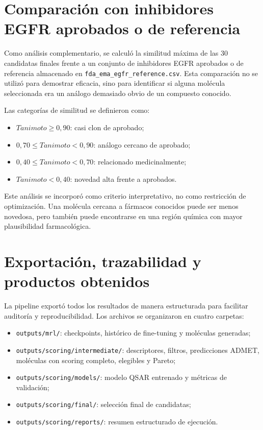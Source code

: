 \documentclass[IB]{TFUOC}%
\begin{document}
\section{Comparación con inhibidores EGFR aprobados o de referencia}

Como análisis complementario, se calculó la similitud máxima de las 30 candidatas finales frente a un conjunto de inhibidores EGFR aprobados o de referencia almacenado en \texttt{fda\_ema\_egfr\_reference.csv}. Esta comparación no se utilizó para demostrar eficacia, sino para identificar si alguna molécula seleccionada era un análogo demasiado obvio de un compuesto conocido.

Las categorías de similitud se definieron como:

\begin{itemize}
    \item $Tanimoto \geq 0,90$: casi clon de aprobado;
    \item $0,70 \leq Tanimoto < 0,90$: análogo cercano de aprobado;
    \item $0,40 \leq Tanimoto < 0,70$: relacionado medicinalmente;
    \item $Tanimoto < 0,40$: novedad alta frente a aprobados.
\end{itemize}

Este análisis se incorporó como criterio interpretativo, no como restricción de optimización. Una molécula cercana a fármacos conocidos puede ser menos novedosa, pero también puede encontrarse en una región química con mayor plausibilidad farmacológica.

\section{Exportación, trazabilidad y productos obtenidos}

La pipeline exportó todos los resultados de manera estructurada para facilitar auditoría y reproducibilidad. Los archivos se organizaron en cuatro carpetas:

\begin{itemize}
    \item \texttt{outputs/mrl/}: checkpoints, histórico de fine-tuning y moléculas generadas;
    \item \texttt{outputs/scoring/intermediate/}: descriptores, filtros, predicciones ADMET, moléculas con scoring completo, elegibles y Pareto;
    \item \texttt{outputs/scoring/models/}: modelo QSAR entrenado y métricas de validación;
    \item \texttt{outputs/scoring/final/}: selección final de candidatas;
    \item \texttt{outputs/scoring/reports/}: resumen estructurado de ejecución.
\end{itemize}
\end{document}
